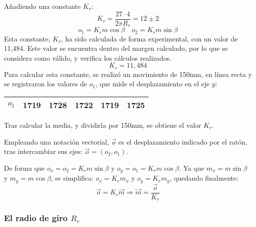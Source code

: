 \documentclass[10pt,a4paper,hidelinks,twocolumn]{article}
\begin{document}
Añadiendo una constante $K_r$:
$$K_r = \frac{27\cdot4}{2 \pi R_r} = 12\pm2$$
$$ o_1 = K_r m \cos \beta \quad
	o_2 = K_r m \sin \beta $$
Esta constante, $K_r$, ha sido calculada de forma experimental, con un valor de 
11,484. Este valor se encuentra dentro del margen calculado, por lo que se 
considera como válido, y verifica los cálculos realizados.
$$K_r = 11,484$$
Para calcular esta constante, se realizó un movimiento de 150mm, en línea recta 
y se registraron los valores de $o_1$, que mide el desplazamiento en el eje $y$:

\begin{center}
\begin{tabular}{ | c | c | c | c | c | c |}
\hline
$o_1$ & 1719 & 1728 & 1722 & 1719 & 1725 \\ \hline
\end{tabular}
\end{center}

Tras calcular la media, y dividirla por 150mm, se obtiene el valor $K_r$.

Empleando una notación vectorial, $\vec{o}$ es el desplazamiento indicado por el 
ratón, tras intercambiar sus ejes: $\vec{o} = (o_2, o_1)$.

De forma que $o_x = o_2 = K_r m \sin \beta$ y $o_y = o_1 = K_r m \cos \beta$. Ya 
que $m_x = m \sin \beta$ y $m_y = m \cos \beta$, se simplifica: $o_x = K_r m_x$ 
y $o_y = K_r m_y$, quedando finalmente:
\begin{equation}
	\vec{o} = K_r \vec{m} \Longrightarrow \vec{m} = \frac{\vec{o}}{K_r}
	\label{eq:o}
\end{equation}
\subsubsection{El radio de giro $R_r$}
\end{document}
